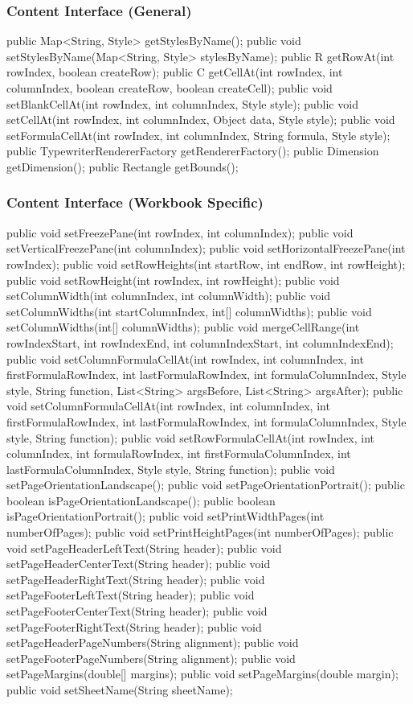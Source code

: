 \documentclass[letterpaper,10pt]{article}
\begin{document}
\subsubsection{Content Interface (General)}
\begin{verbatimtab}
	public Map<String, Style> getStylesByName();
	public void setStylesByName(Map<String, Style> stylesByName);
	public R getRowAt(int rowIndex, boolean createRow);
	public C getCellAt(int rowIndex, int columnIndex, boolean createRow, boolean createCell);
	public void setBlankCellAt(int rowIndex, int columnIndex, Style style);
	public void setCellAt(int rowIndex, int columnIndex, Object data, Style style);
	public void setFormulaCellAt(int rowIndex, int columnIndex, String formula, Style style);
	public TypewriterRendererFactory getRendererFactory();
	public Dimension getDimension();
	public Rectangle getBounds();
\end{verbatimtab}
\subsubsection{Content Interface (Workbook Specific)}
\begin{verbatimtab}
	public void setFreezePane(int rowIndex, int columnIndex);
	public void setVerticalFreezePane(int columnIndex);
	public void setHorizontalFreezePane(int rowIndex);
	public void setRowHeights(int startRow, int endRow, int rowHeight);
	public void setRowHeight(int rowIndex, int rowHeight);
	public void setColumnWidth(int columnIndex, int columnWidth);
	public void setColumnWidths(int startColumnIndex, int[] columnWidths);
	public void setColumnWidths(int[] columnWidths);
	public void mergeCellRange(int rowIndexStart, int rowIndexEnd,
			int columnIndexStart, int columnIndexEnd);
	public void setColumnFormulaCellAt(int rowIndex, int columnIndex,
			int firstFormulaRowIndex, int lastFormulaRowIndex,
			int formulaColumnIndex, Style style, String function,
			List<String> argsBefore, List<String> argsAfter);
	public void setColumnFormulaCellAt(int rowIndex, int columnIndex,
			int firstFormulaRowIndex, int lastFormulaRowIndex,
			int formulaColumnIndex, Style style, String function);
	public void setRowFormulaCellAt(int rowIndex, int columnIndex,
			int formulaRowIndex, int firstFormulaColumnIndex,
			int lastFormulaColumnIndex, Style style, String function);
	public void setPageOrientationLandscape();
	public void setPageOrientationPortrait();
	public boolean isPageOrientationLandscape();
	public boolean isPageOrientationPortrait();
	public void setPrintWidthPages(int numberOfPages);
	public void setPrintHeightPages(int numberOfPages);
	public void setPageHeaderLeftText(String header);
	public void setPageHeaderCenterText(String header);
	public void setPageHeaderRightText(String header);
	public void setPageFooterLeftText(String header);
	public void setPageFooterCenterText(String header);
	public void setPageFooterRightText(String header);
	public void setPageHeaderPageNumbers(String alignment);
	public void setPageFooterPageNumbers(String alignment);
	public void setPageMargins(double[] margins);
	public void setPageMargins(double margin);
	public void setSheetName(String sheetName);
\end{verbatimtab}
\end{document}
